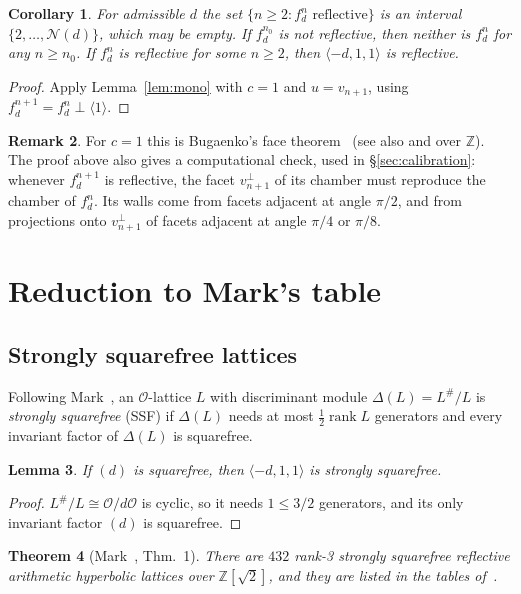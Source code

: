 \documentclass[11pt]{amsart}
\newtheorem{theorem}{Theorem}[section]
\newtheorem{lemma}[theorem]{Lemma}
\newtheorem{corollary}[theorem]{Corollary}
\theoremstyle{definition}
\newtheorem{remark}[theorem]{Remark}
\newcommand{\Z}{\mathbb{Z}}
\newcommand{\OK}{\mathcal{O}}
\newcommand{\Nmax}{\mathcal{N}}
\begin{document}
\begin{corollary}\label{cor:interval}
For admissible $d$ the set $\{n\ge2: f_d^n\text{ reflective}\}$ is an interval
$\{2,\dots,\Nmax(d)\}$, which may be empty. If $f_d^{n_0}$ is not reflective, then neither is
$f_d^n$ for any $n\ge n_0$. If $f_d^n$ is reflective for some $n\ge2$, then
$\langle-d,1,1\rangle$ is reflective.
\end{corollary}
\begin{proof}
Apply Lemma~\ref{lem:mono} with $c=1$ and $u=v_{n+1}$, using
$f_d^{n+1}=f_d^n\perp\langle1\rangle$.
\end{proof}

\begin{remark}
For $c=1$ this is Bugaenko's face theorem~\cite{Bug90} (see also \cite[Thm.~3.0.8]{McTh} and
\cite[Prop.~3.1]{Mar15} over $\Z$). The proof above also gives a computational check, used in
\S\ref{sec:calibration}: whenever $f_d^{n+1}$ is reflective, the facet $v_{n+1}^\perp$ of its
chamber must reproduce the chamber of $f_d^n$. Its walls come from facets adjacent at angle
$\pi/2$, and from projections onto $v_{n+1}^\perp$ of facets adjacent at angle $\pi/4$ or
$\pi/8$.
\end{remark}

\section{Reduction to Mark's table}\label{sec:reduction}

\subsection{Strongly squarefree lattices}
Following Mark~\cite[\S2]{Mar18}, an $\OK$-lattice $L$ with discriminant module
$\Delta(L)=L^\#/L$ is \emph{strongly squarefree} (SSF) if $\Delta(L)$ needs at most
$\frac12\operatorname{rank}L$ generators and every invariant factor of $\Delta(L)$ is
squarefree.

\begin{lemma}\label{lem:ssf}
If $(d)$ is squarefree, then $\langle-d,1,1\rangle$ is strongly squarefree.
\end{lemma}
\begin{proof}
$L^\#/L\cong\OK/d\OK$ is cyclic, so it needs $1\le 3/2$ generators, and its only invariant factor
$(d)$ is squarefree.
\end{proof}

\begin{theorem}[Mark~\cite{Mar18}, Thm.~1]\label{thm:mark}
There are $432$ rank-3 strongly squarefree reflective arithmetic hyperbolic lattices over
$\Z[\sqrt2]$, and they are listed in the tables of~\cite[Appendix]{Mar18}.
\end{theorem}
\end{document}
